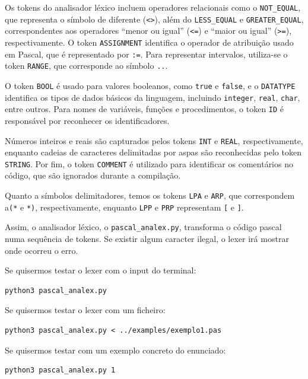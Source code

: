 \documentclass[12pt,a4paper]{report}
\begin{document}
Os tokens do analisador léxico incluem operadores relacionais como o \texttt{NOT\_EQUAL}, que representa o símbolo de diferente (\texttt{<>}), além do \texttt{LESS\_EQUAL} e \texttt{GREATER\_EQUAL}, correspondentes aos operadores “menor ou igual” (\texttt{<=}) e “maior ou igual” (\texttt{>=}), respectivamente. O token \texttt{ASSIGNMENT} identifica o operador de atribuição usado em Pascal, que é representado por \texttt{:=}. Para representar intervalos, utiliza-se o token \texttt{RANGE}, que corresponde ao símbolo \texttt{..}.

O token \texttt{BOOL} é usado para valores booleanos, como \texttt{true} e \texttt{false}, e o \texttt{DATATYPE} identifica os tipos de dados básicos da linguagem, incluindo \texttt{integer}, \texttt{real}, \texttt{char}, entre outros. Para nomes de variáveis, funções e procedimentos, o token \texttt{ID} é responsável por reconhecer os identificadores.

Números inteiros e reais são capturados pelos tokens \texttt{INT} e \texttt{REAL}, respectivamente, enquanto cadeias de caracteres delimitadas por aspas são reconhecidas pelo token \texttt{STRING}. Por fim, o token \texttt{COMMENT} é utilizado para identificar os comentários no código, que são ignorados durante a compilação.

Quanto a símbolos delimitadores, temos os tokens \texttt{LPA} e \texttt{ARP}, que correspondem a\texttt{(*} e \texttt{*)}, respectivamente, enquanto \texttt{LPP} e \texttt{PRP} representam \texttt{[} e \texttt{]}.

Assim, o analisador léxico, o \texttt{pascal\_analex.py}, transforma o código pascal numa sequência de tokens. Se existir algum caracter ilegal, o lexer irá mostrar onde ocorreu o erro.

\vspace{1em}

Se quisermos testar o lexer com o input do terminal:
\begin{verbatim}
python3 pascal_analex.py
\end{verbatim}

Se quisermos testar o lexer com um ficheiro:
\begin{verbatim}
python3 pascal_analex.py < ../examples/exemplo1.pas
\end{verbatim}

Se quisermos testar com um exemplo concreto do enunciado:
\begin{verbatim}
python3 pascal_analex.py 1
\end{verbatim}
\end{document}
